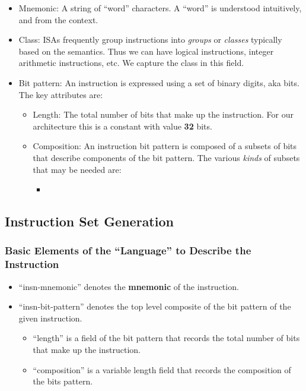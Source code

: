 \begin{itemize}
\item  Mnemonic:  A string  of  ``word''  characters.   A ``word''  is
  understood intuitively, and from the context.
\item Class: ISAs frequently  group instructions into \emph{groups} or
  \emph{classes} typically  based on the semantics.  Thus  we can have
  logical  instructions,  integer  arithmetic  instructions,  etc.  We
  capture the class in this field.
\item Bit pattern:  An instruction is expressed using  a set of binary
  digits, aka bits.  The key attributes are:
  \begin{itemize}
  \item Length: The total number of bits that make up the instruction.
    For  our architecture this  is a  constant with  value \textbf{32}
    bits.
  \item  Composition: An  instruction  bit pattern  is  composed of  a
    subsets of bits that describe  components of the bit pattern.  The
    various \emph{kinds} of subsets that may be needed are:
    \begin{itemize}
    \item 
    \end{itemize}
  \end{itemize}
\end{itemize}

\subsection{Instruction Set Generation}
\label{sec:generate:isa}

\subsubsection{Basic Elements of the ``Language'' to Describe the
  Instruction}
\label{sec:describe:isa:lang}

\begin{itemize}
\item   ``insn-mnemonic''  denotes   the   \textbf{mnemonic}  of   the
  instruction.
\item ``insn-bit-pattern'' denotes the  top level composite of the bit
  pattern of the given instruction.
  \begin{itemize}
  \item  ``length'' is a  field of  the bit  pattern that  records the
    total number of bits that make up the instruction.
  \item ``composition''  is a variable  length field that  records the
    composition of the bits pattern.
  \end{itemize}
\end{itemize}